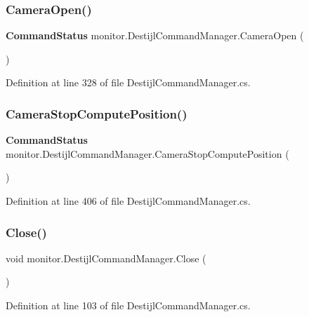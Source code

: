 \subsubsection{Camera\+Open()}
{\footnotesize\ttfamily \textbf{ Command\+Status} monitor.\+Destijl\+Command\+Manager.\+Camera\+Open (\begin{DoxyParamCaption}{ }\end{DoxyParamCaption})}



Definition at line 328 of file Destijl\+Command\+Manager.\+cs.

\mbox{\label{classmonitor_1_1_destijl_command_manager_a928f987f8f5f12135614678585ab2726}} 
\subsubsection{Camera\+Stop\+Compute\+Position()}
{\footnotesize\ttfamily \textbf{ Command\+Status} monitor.\+Destijl\+Command\+Manager.\+Camera\+Stop\+Compute\+Position (\begin{DoxyParamCaption}{ }\end{DoxyParamCaption})}



Definition at line 406 of file Destijl\+Command\+Manager.\+cs.

\mbox{\label{classmonitor_1_1_destijl_command_manager_af1f57d8e3e980322e37da2cd3b61d1d7}} 
\subsubsection{Close()}
{\footnotesize\ttfamily void monitor.\+Destijl\+Command\+Manager.\+Close (\begin{DoxyParamCaption}{ }\end{DoxyParamCaption})}



Definition at line 103 of file Destijl\+Command\+Manager.\+cs.

\mbox{\label{classmonitor_1_1_destijl_command_manager_acc08ece6a89e842188364226299b3d43}} 
